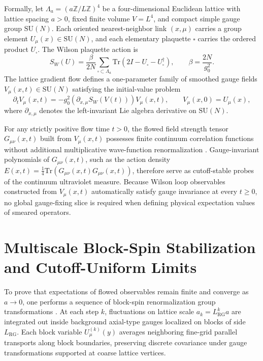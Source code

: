 \documentclass[11pt,a4paper]{article}
\newcommand{\Z}{\mathbb{Z}}
\newcommand{\SU}{\mathrm{SU}}
\newcommand{\tr}{\mathrm{Tr}}
\begin{document}
Formally, let $\Lambda_a = (a\Z / L\Z)^4$ be a four-dimensional Euclidean lattice with lattice spacing $a > 0$, fixed finite volume $V = L^4$, and compact simple gauge group $\SU(N)$. Each oriented nearest-neighbor link $(x, \mu)$ carries a group element $U_\mu(x) \in \SU(N)$, and each elementary plaquette $\square$ carries the ordered product $U_\square$. The Wilson plaquette action is
\begin{equation}
S_W(U) = \frac{\beta}{2N} \sum_{\square \subset \Lambda_a} \tr\left(2I - U_\square - U_\square^\dagger\right), \qquad \beta = \frac{2N}{g_0^2}.
\end{equation}
The lattice gradient flow defines a one-parameter family of smoothed gauge fields $V_\mu(x, t) \in \SU(N)$ satisfying the initial-value problem
\begin{equation}
\partial_t V_\mu(x, t) = -g_0^2 \left( \partial_{x,\mu} S_W(V(t)) \right) V_\mu(x, t), \qquad V_\mu(x, 0) = U_\mu(x),
\end{equation}
where $\partial_{x,\mu}$ denotes the left-invariant Lie algebra derivative on $\SU(N)$.

For any strictly positive flow time $t > 0$, the flowed field strength tensor $G_{\mu\nu}(x, t)$ built from $V_\mu(x, t)$ possesses finite continuum correlation functions without additional multiplicative wave-function renormalization \cite{LuscherWeisz2011JHEP}. Gauge-invariant polynomials of $G_{\mu\nu}(x, t)$, such as the action density $E(x, t) = \frac{1}{4} \tr(G_{\mu\nu}(x, t) G_{\mu\nu}(x, t))$, therefore serve as cutoff-stable probes of the continuum ultraviolet measure. Because Wilson loop observables constructed from $V_\mu(x, t)$ automatically satisfy gauge invariance at every $t \ge 0$, no global gauge-fixing slice is required when defining physical expectation values of smeared operators.

\section{Multiscale Block-Spin Stabilization and Cutoff-Uniform Limits}
To prove that expectations of flowed observables remain finite and converge as $a \to 0$, one performs a sequence of block-spin renormalization group transformations \cite{Balaban1987CMP109,Balaban1988CMP116}. At each step $k$, fluctuations on lattice scale $a_k = L_{\mathrm{RG}}^k a$ are integrated out inside background axial-type gauges localized on blocks of side $L_{\mathrm{RG}}$. Each block variable $U^{(k)}_\mu(y)$ averages neighboring fine-grid parallel transports along block boundaries, preserving discrete covariance under gauge transformations supported at coarse lattice vertices.
\end{document}
